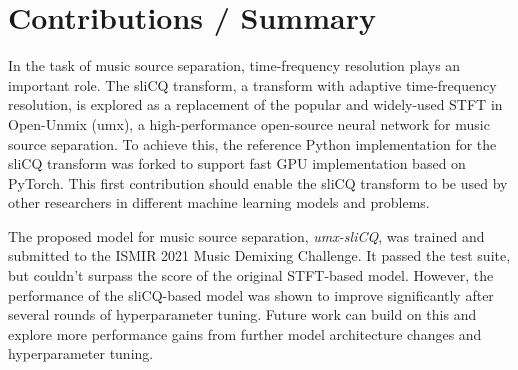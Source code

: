 \documentclass[letter,12pt]{scrartcl}
\begin{document}
\section{Contributions / Summary}

In the task of music source separation, time-frequency resolution plays an important role. The sliCQ transform, a transform with adaptive time-frequency resolution, is explored as a replacement of the popular and widely-used STFT in Open-Unmix (umx), a high-performance open-source neural network for music source separation. To achieve this, the reference Python implementation for the sliCQ transform was forked to support fast GPU implementation based on PyTorch. This first contribution should enable the sliCQ transform to be used by other researchers in different machine learning models and problems.

The proposed model for music source separation, \textit{umx-sliCQ}, was trained and submitted to the ISMIR 2021 Music Demixing Challenge. It passed the test suite, but couldn't surpass the score of the original STFT-based model. However, the performance of the sliCQ-based model was shown to improve significantly after several rounds of hyperparameter tuning. Future work can build on this and explore more performance gains from further model architecture changes and hyperparameter tuning.

\vfill
\clearpage %

\printbibheading[title={References},heading=bibnumbered]
\printbibliography[heading=none]

\vfill
\clearpage %
\end{document}
